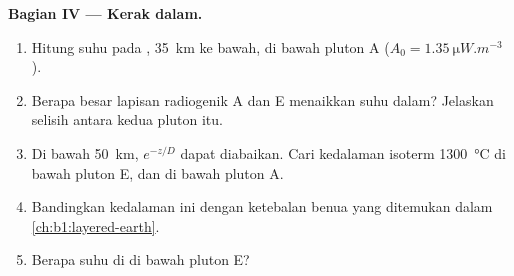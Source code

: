 \begin{problem}
\noindent\textbf{Bagian IV --- Kerak dalam.}
\begin{enumerate}[resume]
  \item Hitung suhu pada , \qty{35}{km} ke bawah, di bawah pluton A ($A_0 = \qty{1.35}{\micro W.m^{-3}}$).
  \item Berapa besar lapisan radiogenik A dan E menaikkan suhu dalam? Jelaskan selisih antara kedua pluton itu.
  \item Di bawah \qty{50}{km}, $e^{-z/D}$ dapat diabaikan. Cari kedalaman isoterm \qty{1300}{\degreeCelsius} di bawah pluton E, dan di bawah pluton A.
  \item Bandingkan kedalaman ini dengan ketebalan  benua yang ditemukan dalam \cref{ch:b1:layered-earth}.
  \item Berapa suhu di  di bawah pluton E?
\end{enumerate}
\end{problem}
